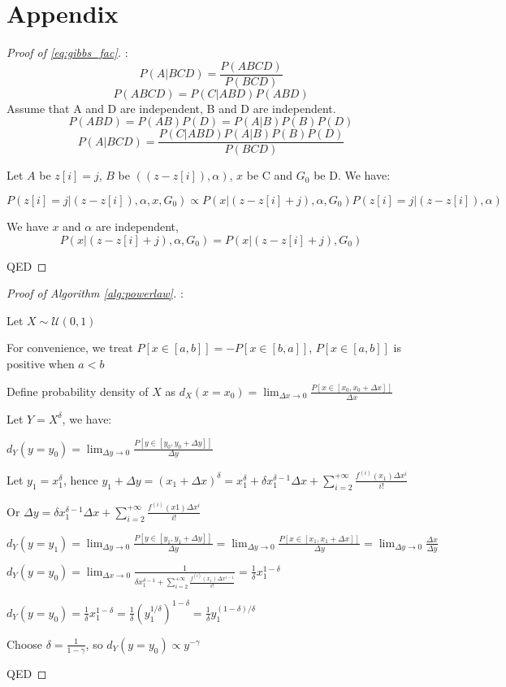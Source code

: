 \chapter{Appendix}

\begin{proof}[Proof of \ref{eq:gibbs_fac}]:\
\[
P(A|BCD) = \frac{P(ABCD)}{P(BCD)}
\]
\[
P(ABCD) = P(C|ABD)P(ABD)
\]
Assume that A and D are independent, B and D are independent.
\[
P(ABD) = P(AB)P(D) = P(A|B)P(B)P(D)
\]
\[
P(A|BCD) = \frac{P(C|ABD)P(A|B)P(B)P(D)}{P(BCD)}
\]

Let $A$ be $z[i] = j$, $B$ be $((z-z[i]), \alpha)$, $x$ be C and $G_0$ be D. We have:

\begin{equation}
    P(z[i] = j | (z - z[i]), \alpha, x, G_0) \propto P(x | (z - z[i] + j), \alpha, G_0)P(z[i] = j | (z - z[i]), \alpha)
\end{equation}


We have $x$ and $\alpha$ are independent,
\begin{equation}
    P(x | (z - z[i] + j), \alpha, G_0) = P(x | (z - z[i] + j),G_0)
\end{equation}

QED

\end{proof}

\begin{proof}[Proof of Algorithm \ref{alg:powerlaw}]:\

Let $X \sim \mathcal{U}(0, 1)$


For convenience, we treat $P[x \in [a, b]] = -P[x \in [b, a]]$, $P[x \in [a, b]]$ is positive when $a < b$

Define probability density of $X$ as $d_X(x = x_0) = \lim_{\Delta x \to 0} \frac{P[x \in [x_0, x_0 + \Delta x]]}{\Delta x}$


Let $Y = X^\delta$, we have:

$d_Y(y = y_0) = \lim_{\Delta y \to 0} \frac{P[y \in [y_0, y_0 + \Delta y]]}{\Delta y}$

Let $y_1 = x_1^\delta$, hence
$y_1 + \Delta y = (x_1 + \Delta x)^\delta = x_1^\delta + \delta x_1^{\delta - 1} \Delta x + \sum_{i = 2}^{+\infty} \frac{f^{(i)}(x_1) \Delta x^i}{i!}$

Or $\Delta y = \delta x_1^{\delta - 1} \Delta x + \sum_{i = 2}^{+\infty} \frac{f^{(i)}(x1) \Delta x^i}{i!}$

$d_Y(y = y_1) = \lim_{\Delta y \to 0} \frac{P[y \in [y_1, y_1 + \Delta y]]}{\Delta y} = \lim_{\Delta y \to 0} \frac{P[x \in [x_1, x_1 + \Delta x]]}{\Delta y} = \lim_{\Delta y \to 0} \frac{\Delta x}{\Delta y}$

$d_Y(y = y_0) = \lim_{\Delta x \to 0} \frac{1}{\delta x_1^{\delta - 1} + \sum_{i = 2}^{+\infty} \frac{f^{(i)}(x_1) \Delta x^{i-1}}{i!}} = \frac{1}{\delta} x_1^{1 - \delta}$

$d_Y(y = y_0) = \frac{1}{\delta} x_1^{1 - \delta} = \frac{1}{\delta} (y_1^{1/\delta})^{1 - \delta} = \frac{1}{\delta} y_1^{(1 - \delta)/\delta}$

Choose $\delta = \frac{1}{1-\gamma}$, so $d_Y(y = y_0) \propto y^{-\gamma}$

QED

\end{proof}